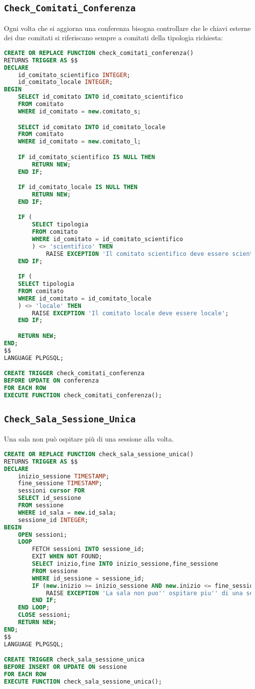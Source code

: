 \subsection{\texttt{Check\_Comitati\_Conferenza}}
Ogni volta che si aggiorna una conferenza bisogna controllare che le chiavi esterne dei due comitati si riferiscano sempre a comitati della tipologia richiesta:
\begin{lstlisting}[language=SQL, caption={\texttt{check\_comitati\_conferenza}},style=mystyle]
CREATE OR REPLACE FUNCTION check_comitati_conferenza() 
RETURNS TRIGGER AS $$
DECLARE 
	id_comitato_scientifico INTEGER;
	id_comitato_locale INTEGER;
BEGIN
	SELECT id_comitato INTO id_comitato_scientifico
	FROM comitato
	WHERE id_comitato = new.comitato_s;

	SELECT id_comitato INTO id_comitato_locale
	FROM comitato
	WHERE id_comitato = new.comitato_l;

	IF id_comitato_scientifico IS NULL THEN
		RETURN NEW;
	END IF;

	IF id_comitato_locale IS NULL THEN
		RETURN NEW;
	END IF;

	IF (
		SELECT tipologia 
		FROM comitato 
		WHERE id_comitato = id_comitato_scientifico
		) <> 'scientifico' THEN
			RAISE EXCEPTION 'Il comitato scientifico deve essere scientifico';
	END IF;

	IF (
	SELECT tipologia 
	FROM comitato 
	WHERE id_comitato = id_comitato_locale
	) <> 'locale' THEN
		RAISE EXCEPTION 'Il comitato locale deve essere locale';
	END IF;

	RETURN NEW;
END;
$$ 
LANGUAGE PLPGSQL;

CREATE TRIGGER check_comitati_conferenza
BEFORE UPDATE ON conferenza
FOR EACH ROW
EXECUTE FUNCTION check_comitati_conferenza();
\end{lstlisting}
\subsection{\texttt{Check\_Sala\_Sessione\_Unica}}
Una sala non può ospitare più di una sessione alla volta.
\begin{lstlisting}[caption={\texttt{Check\_sala\_sessione\_unica}}, language=SQL, style=mystyle]
CREATE OR REPLACE FUNCTION check_sala_sessione_unica() 
RETURNS TRIGGER AS $$
DECLARE
	inizio_sessione TIMESTAMP;
	fine_sessione TIMESTAMP;
	sessioni cursor FOR 
	SELECT id_sessione 
	FROM sessione 
	WHERE id_sala = new.id_sala;
	sessione_id INTEGER;
BEGIN
	OPEN sessioni;
	LOOP
		FETCH sessioni INTO sessione_id;
		EXIT WHEN NOT FOUND;
		SELECT inizio,fine INTO inizio_sessione,fine_sessione
		FROM sessione
		WHERE id_sessione = sessione_id;
		IF (new.inizio >= inizio_sessione AND new.inizio <= fine_sessione) OR (new.fine >= inizio_sessione AND new.fine <= fine_sessione) THEN
			RAISE EXCEPTION 'La sala non puo'' ospitare piu'' di una sessione alla volta';
		END IF;
	END LOOP;
	CLOSE sessioni;
	RETURN NEW;
END;
$$ 
LANGUAGE PLPGSQL;

CREATE TRIGGER check_sala_sessione_unica
BEFORE INSERT OR UPDATE ON sessione
FOR EACH ROW
EXECUTE FUNCTION check_sala_sessione_unica();
\end{lstlisting}
